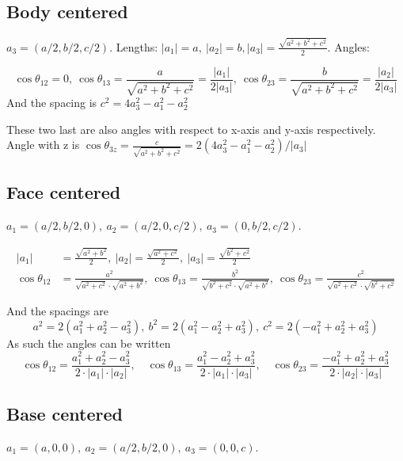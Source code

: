 \documentclass[a4paper,10pt]{article} 	%
\numberwithin{equation}{section}
\begin{document}
	\subsection{Body centered}
	$a_3 = (a/2, b/2, c/2)$. Lengths: $|a_1| = a,\ |a_2| = b, |a_3| = \frac{\sqrt{a^2+b^2+c^2}}{2}$. Angles: 
	
	\begin{equation}
		\cos \theta_{12} = 0,\ \cos \theta_{13} = \frac{a}{\sqrt{a^2+b^2+c^2}} = \frac{|a_1|}{2|a_3|},\ \cos \theta_{23} = \frac{b}{\sqrt{a^2+b^2+c^2}} = \frac{|a_2|}{2|a_3|}
	\end{equation}
	And the spacing is $ c^2 = 4a_3^2-a_1^2-a_2^2 $
	
	These two last are also angles with respect to x-axis and y-axis respectively. Angle with z is $\cos\theta_{3z} = \frac{c}{\sqrt{a^2+b^2+c^2}} = 2(4a_3^2-a_1^2-a_2^2)/|a_3|$
	
	\subsection{Face centered}
	$ a_1 = (a/2,b/2,0), \ a_2 = (a/2,0,c/2), \ a_3 = (0,b/2,c/2) $.
	
	\begin{align} 
	|a_1| &= \frac{\sqrt{a^2+b^2}}{2}, \ |a_2| = \frac{\sqrt{a^2+c^2}}{2}, \ |a_3| = \frac{\sqrt{b^2+c^2}}{2} \\
	\cos \theta_{12} &= \frac{a^2}{\sqrt{a^2+c^2} \cdot \sqrt{a^2+b^2}},\ \cos \theta_{13} = \frac{b^2}{\sqrt{b^2+c^2} \cdot \sqrt{a^2+b^2}},\ \cos \theta_{23} = \frac{c^2}{\sqrt{a^2+c^2} \cdot \sqrt{b^2+c^2}} 
	\end{align}
	
	And the spacings are
	\begin{equation}\label{key}
		a^2 = 2 (a_1^2+a_2^2-a_3^2), \ b^2 = 2(a_1^2-a_2^2+a_3^2), \ c^2 = 2(-a_1^2+a_2^2+a_3^2)
	\end{equation}
	As such the angles can be written
	\begin{equation}\label{key}
		\cos \theta_{12} = \frac{a_1^2+a_2^2-a_3^2}{2 \cdot |a_1| \cdot |a_2|}, \quad
		\cos \theta_{13} = \frac{a_1^2-a_2^2+a_3^2}{2 \cdot |a_1| \cdot |a_3|}, \quad
		\cos \theta_{23} = \frac{-a_1^2+a_2^2+a_3^2}{2 \cdot |a_2| \cdot |a_3|}
	\end{equation}
	
	
	\subsection{Base centered}
	$ a_1 = (a,0,0),\ a_2 = (a/2,b/2,0),\ a_3 = (0,0,c) $.
	
\end{document}
